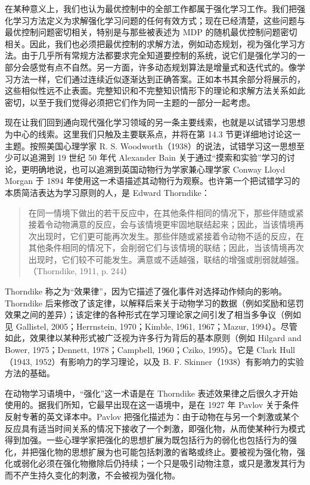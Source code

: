 \documentclass[UTF8, 12pt, fontset=fandol, oneside]{ctexart}
\begin{document}
在某种意义上，我们也认为最优控制中的全部工作都属于强化学习工作。我们把强化学习方法定义为求解强化学习问题的任何有效方式；现在已经清楚，这些问题与最优控制问题密切相关，特别是与那些被表述为 MDP 的随机最优控制问题密切相关。因此，我们也必须把最优控制的求解方法，例如动态规划，视为强化学习方法。由于几乎所有常规方法都要求完全知道要控制的系统，说它们是强化学习的一部分会感觉有点不自然。另一方面，许多动态规划算法是增量式和迭代式的。像学习方法一样，它们通过连续近似逐渐达到正确答案。正如本书其余部分将展示的，这些相似性远不止表面。完整知识和不完整知识情形下的理论和求解方法关系如此密切，以至于我们觉得必须把它们作为同一主题的一部分一起考虑。

现在让我们回到通向现代强化学习领域的另一条主要线索，也就是以试错学习思想为中心的线索。这里我们只触及主要联系点，并将在第 14.3 节更详细地讨论这一主题。按照美国心理学家 R. S. Woodworth（1938）的说法，试错学习这一思想至少可以追溯到 19 世纪 50 年代 Alexander Bain 关于通过“摸索和实验”学习的讨论，更明确地说，也可以追溯到英国动物行为学家兼心理学家 Conway Lloyd Morgan 于 1894 年使用这一术语描述其动物行为观察。也许第一个把试错学习的本质简洁表达为学习原则的人，是 Edward Thorndike：

\begin{quote}
在同一情境下做出的若干反应中，在其他条件相同的情况下，那些伴随或紧接着令动物满意的反应，会与该情境更牢固地联结起来；因此，当该情境再次出现时，它们更可能再次发生。那些伴随或紧接着令动物不适的反应，在其他条件相同的情况下，会削弱它们与该情境的联结；因此，当该情境再次出现时，它们较不可能发生。满意或不适越强，联结的增强或削弱就越强。（Thorndike, 1911, p. 244）
\end{quote}

Thorndike 称之为“效果律”，因为它描述了强化事件对选择动作倾向的影响。Thorndike 后来修改了该定律，以解释后来关于动物学习的数据（例如奖励和惩罚效果之间的差异）；该定律的各种形式在学习理论家之间引发了相当多争议（例如见 Gallistel, 2005；Herrnstein, 1970；Kimble, 1961, 1967；Mazur, 1994）。尽管如此，效果律以某种形式被广泛视为许多行为背后的基本原则（例如 Hilgard and Bower, 1975；Dennett, 1978；Campbell, 1960；Cziko, 1995）。它是 Clark Hull（1943, 1952）有影响力的学习理论，以及 B. F. Skinner（1938）有影响力的实验方法的基础。

在动物学习语境中，“强化”这一术语是在 Thorndike 表述效果律之后很久才开始使用的。据我们所知，它最早出现在这一语境中，是在 1927 年 Pavlov 关于条件反射专著的英文译本中。Pavlov 把强化描述为：由于动物在与另一个刺激或某个反应具有适当时间关系的情况下接收了一个刺激，即强化物，从而使某种行为模式得到加强。一些心理学家把强化的思想扩展为既包括行为的弱化也包括行为的强化，并把强化物的思想扩展为也可能包括刺激的省略或终止。要被视为强化物，强化或弱化必须在强化物撤除后仍持续；一个只是吸引动物注意，或只是激发其行为而不产生持久变化的刺激，不会被视为强化物。
\end{document}
